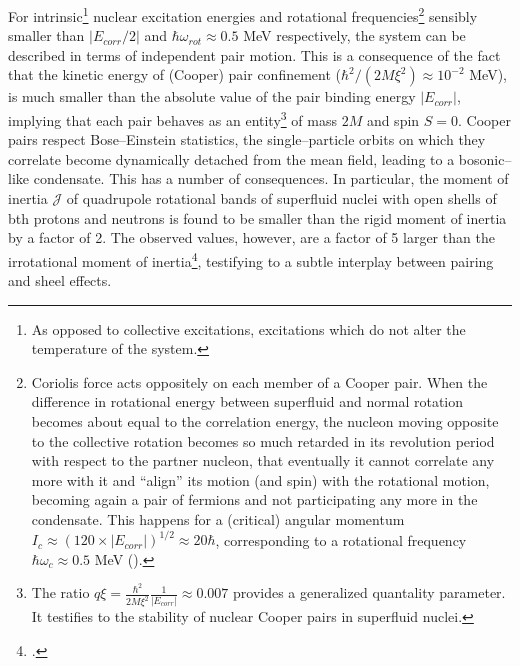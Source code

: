 For intrinsic\footnote{As opposed to collective excitations, excitations which do not alter the temperature of the system.} nuclear excitation energies and rotational frequencies\footnote{Coriolis force acts oppositely on each member of a Cooper pair. When the difference in rotational energy between superfluid and normal rotation becomes about equal to the correlation energy, the nucleon moving opposite to the collective rotation becomes so much retarded in its revolution period with respect to the partner nucleon, that eventually it cannot correlate any more with it and ``align'' its motion (and spin) with the rotational motion, becoming again a pair of fermions and not participating any more in the condensate. This happens for a (critical) angular momentum $I_c\approx(120\times|E_{corr}|)^{1/2}\approx 20\hbar$, corresponding to a rotational frequency $\hbar\omega_c\approx 0.5$ MeV (\cite{Brink:05}).} sensibly smaller than $|E_{corr}/2|$ and $\hbar\omega_{rot}\approx0.5$ MeV respectively, the system can be described in terms of independent pair motion. This is a consequence of the fact that the kinetic energy of (Cooper) pair confinement ($\hbar^2/(2M\xi^2)\approx 10^{-2}$ MeV), is much smaller than the absolute value of the pair binding energy $|E_{corr}|$, implying that each pair behaves as an entity\footnote{The ratio $q\xi=\frac{\hbar^2}{2M\xi^2}\frac{1}{|E_{corr}|}\approx 0.007$ provides a generalized quantality parameter. It testifies to the stability of nuclear Cooper pairs in superfluid nuclei.} of mass $2M$ and spin $S=0$. Cooper pairs respect Bose--Einstein statistics, the single--particle orbits on which they correlate become dynamically detached from the mean field, leading to a bosonic--like condensate. This has a number of consequences. In particular, the moment of inertia $\mathcal J$ of quadrupole rotational bands of superfluid nuclei with open shells of bth protons and neutrons is found to be smaller than the rigid moment of inertia by a factor of 2. The observed values, however, are a factor of 5 larger than the irrotational moment of inertia\footnote{\cite{Bohr:75,Belyaev:59,Belyaev:13}.}, testifying to a subtle interplay between pairing and sheel effects.
